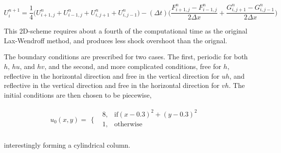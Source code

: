 \begin{dmath}\label{eqn:11}
U_{i}^{n+1} = \frac{1}{4} \Big( U_{i+1,j}^{n} + U_{i-1,j}^{n} + U_{i,j+1}^{n} + U_{i,j-1}^{n} \Big) 
- (\Delta t) \Big( \frac{ F_{i+1,j}^{n} - F_{i-1,j}^{n} }{2 \Delta x}  + \frac{ G_{i,j+1}^{n} - G_{i,j-1}^{n} }{ 2 \Delta x }  \Big)
\end{dmath} 

This 2D-scheme requires about a fourth of the computational time as the original Lax-Wendroff method, and produces less shock overshoot than the orignal. 
\newline

The boundary conditions are prescribed for two cases. The first, periodic for both $h$, $hu$, and $hv$, and the second,
 and more complicated conditions, free for $h$, reflective in the horizontal direction and free in the vertical direction 
for $uh$, and reflective in the vertical direction and free in the horizontal direction for $vh$. The initial conditions are then
 chosen to be piecewise, 

\begin{equation}\label{eqn:12}
u_0(x,y)=
\begin{array}{ll}
\Big\{ & 
\begin{array}{ll}
 8, & \text{if} (x-0.3)^2+(y-0.3)^2 \\
 1, & \text{otherwise} \\
\end{array}
\end{array}
\end{equation}

interestingly forming a cylindrical column.



